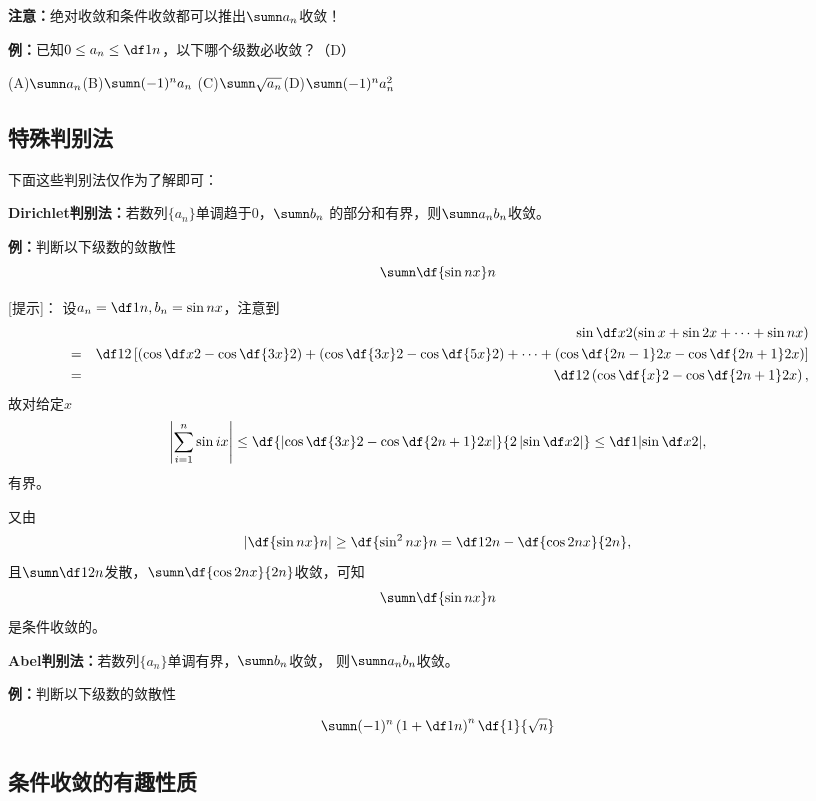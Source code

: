 {\b{\bf 注意：}绝对收敛和条件收敛都可以推出$\sumn a_n$收敛！}

{\bf 例：}已知$0\leq a_n\leq\df1n$，以下哪个级数必收敛？\hfill（D）

\quad(A)\;$\sumn a_n$\quad(B)$\sumn (-1)^na_n$
\quad(C)$\sumn \sqrt{a_n}$\quad(D)$\sumn (-1)^na^2_n$

\begin{shaded}

\subsection{特殊判别法}

下面这些判别法仅作为了解即可：

\begin{tcolorbox}
	{\bf Dirichlet判别法：}若数列$\{a_n\}$单调趋于$0$，$\sumn b_n$
  	的部分和有界，则$\sumn a_nb_n$收敛。
\end{tcolorbox}
  
{\bf 例：}判断以下级数的敛散性
$$\sumn\df{\sin nx}n$$

[提示]：
设$a_n=\df1n,b_n=\sin nx$，注意到
\begin{eqnarray*}
&&\sin\df x2(\sin x+\sin2x+\cdots+\sin nx)\\
&=&\df12\left[\left(\cos\df x2-\cos\df{3x}2\right)+
\left(\cos\df {3x}2-\cos\df{5x}2\right)+\cdots+
\left(\cos\df {2n-1}2x-\cos\df{2n+1}2x\right)\right]\\
&=&\df12\left(\cos\df{x}2-\cos\df{2n+1}2x\right),
\end{eqnarray*}
故对给定$x$
$$\left|\sum\limits_{i=1}^n\sin ix\right|
\leq\df{\left|\cos\df{3x}2-\cos\df{2n+1}2x\right|}{2\left|\sin\df x2\right|}
\leq\df1{\left|\sin\df x2\right|},$$
有界。

又由
$$\left|\df{\sin nx}n\right|\geq\df{\sin^2nx}n=\df1{2n}-\df{\cos2nx}{2n},$$
且$\sumn\df1{2n}$发散，$\sumn\df{\cos2nx}{2n}$收敛，可知
$$\sumn\df{\sin nx}n$$是条件收敛的。

\begin{tcolorbox}
	{\bf Abel判别法：}若数列$\{a_n\}$单调有界，$\sumn b_n$收敛，
	则$\sumn a_nb_n$收敛。
\end{tcolorbox}

{\bf 例：}判断以下级数的敛散性

$$\sumn(-1)^n\left(1+\df 1n\right)^n\df{1}{\sqrt n}$$ 

\subsection{条件收敛的有趣性质}


\end{shaded}
